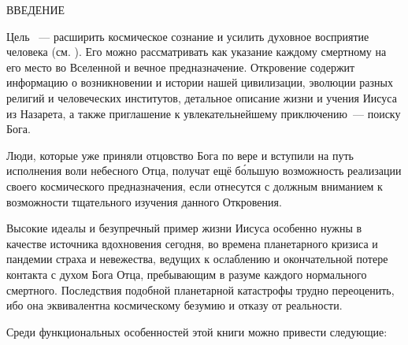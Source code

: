 \newpage
\thispagestyle{empty}
\fancyhead[C]{}

\makeatletter
{}%
\makeatother

\begin{center}
\bibpapertitlefont
ВВЕДЕНИЕ
\end{center}

\bibbookend

Цель ~--- расширить космическое сознание
и усилить духовное восприятие человека (см. ).
Его можно рассматривать как указание каждому смертному на его место во Вселенной и вечное предназначение.
Откровение содержит информацию о возникновении и истории нашей цивилизации, эволюции разных религий
и человеческих институтов, детальное описание жизни и учения Иисуса из Назарета,
а также приглашение к увлекательнейшему приключению~--- поиску Бога.

Люди, которые уже приняли отцовство Бога по вере и вступили на путь исполнения воли небесного Отца, получат
ещё б\'ольшую возможность реализации своего космического предназначения, если отнесутся с должным вниманием
к возможности тщательного изучения данного Откровения.

Высокие идеалы и безупречный пример жизни Иисуса особенно нужны в качестве источника вдохновения сегодня,
во времена планетарного кризиса и пандемии страха и невежества,
ведущих к ослаблению и окончательной потере контакта с духом Бога Отца, пребывающим в разуме каждого нормального смертного.
Последствия подобной планетарной катастрофы трудно переоценить, ибо она эквивалентна космическому безумию и отказу от
реальности.

Среди функциональных особенностей этой книги можно привести следующие:

